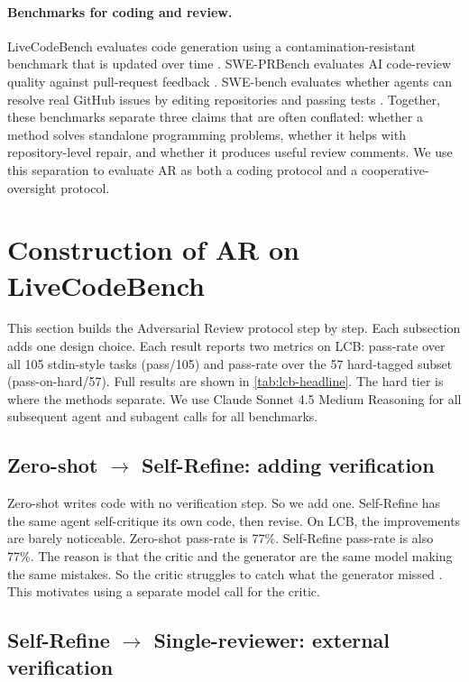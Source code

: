 \documentclass{article}
\begin{document}
\paragraph{Benchmarks for coding and review.}
LiveCodeBench evaluates code generation using a contamination-resistant benchmark that is updated over time \citep{livecodebench2024}. SWE-PRBench evaluates AI code-review quality against pull-request feedback \citep{swe-prbench2026}. SWE-bench evaluates whether agents can resolve real GitHub issues by editing repositories and passing tests \citep{swebench}. Together, these benchmarks separate three claims that are often conflated: whether a method solves standalone programming problems, whether it helps with repository-level repair, and whether it produces useful review comments. We use this separation to evaluate AR as both a coding protocol and a cooperative-oversight protocol.

\section{Construction of AR on LiveCodeBench}
\label{sec:lcb}

This section builds the Adversarial Review protocol step by step. Each subsection adds one
design choice. Each result reports two metrics on LCB: pass-rate over
all 105 stdin-style tasks (pass/105) and pass-rate over the 57
hard-tagged subset (pass-on-hard/57). Full results are shown in \autoref{tab:lcb-headline}. The hard tier is where the methods
separate. We use Claude Sonnet 4.5 Medium Reasoning for all subsequent agent and subagent calls for all benchmarks.

\subsection{Zero-shot $\to$ Self-Refine: adding verification}
\label{sec:lcb-sr}

Zero-shot writes code with no verification step. So we add one.
Self-Refine \citep{madaan2023self} has the same agent self-critique its
own code, then revise. On LCB, the improvements are barely noticeable. Zero-shot pass-rate
is 77\%. Self-Refine pass-rate is also 77\%.  The reason is that the critic and the generator are
the same model making the same mistakes. So the critic struggles to catch what the generator missed \citep{olausson2024}. This motivates using a separate model call for the critic.

\subsection{Self-Refine $\to$ Single-reviewer: external verification}
\label{sec:lcb-singler}
\end{document}
